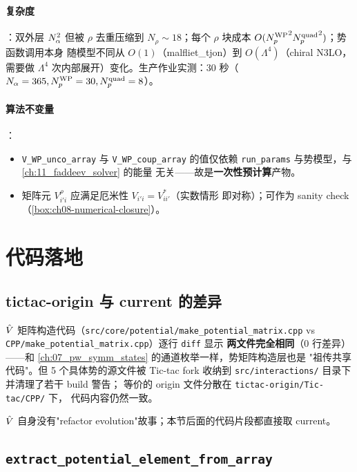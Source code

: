 \paragraph{复杂度}：双外层 \(N_\alpha^2\) 但被 \(\rho\) 去重压缩到
\(N_\rho \sim 18\)；每个 \(\rho\) 块成本 \(O({N_{p}^{\text{WP}}}^2 {N_{p}^{\text{quad}}}^2)\)；势函数调用本身
随模型不同从 \(O(1)\)（malfliet\_tjon）到 \(O(\Lambda^4)\)（chiral N3LO，需要做
\(\Lambda^4\) 次内部展开）变化。生产作业实测：30 秒（\(N_\alpha = 365, {N_{p}^{\text{WP}}} = 30,
{N_{p}^{\text{quad}}} = 8\)）。

\paragraph{算法不变量}：
\begin{itemize}
  \item \texttt{V\_WP\_unco\_array} 与 \texttt{V\_WP\_coup\_array} 的值仅依赖
        \texttt{run\_params} 与势模型，与 \cref{ch:11_faddeev_solver} 的能量
        无关——故是\textbf{一次性预计算}产物。
  \item 矩阵元 \(V_{i'i}^{\rho}\) 应满足厄米性 \(V_{i'i} = V_{ii'}^*\)（实数情形
        即对称）；可作为 sanity check（\cref{box:ch08-numerical-closure}）。
\end{itemize}

\section{代码落地}
\label{sec:ch08-code}

\subsection{tictac-origin 与 current 的差异}
\label{subsec:ch08-origin-current}

\(\hat{V}\) 矩阵构造代码（\texttt{src/core/potential/make\_potential\_matrix.cpp}
vs \texttt{CPP/make\_potential\_matrix.cpp}）逐行 \texttt{diff} 显示
\textbf{两文件完全相同}（\(0\) 行差异）——和
\cref{ch:07_pw_symm_states} 的通道枚举一样，势矩阵构造层也是
"祖传共享代码"。但 5 个具体势的源文件被 Tic-tac fork 收纳到
\texttt{src/interactions/} 目录下并清理了若干 build 警告；
等价的 origin 文件分散在 \texttt{tictac-origin/Tic-tac/CPP/} 下，
代码内容仍然一致。

\(\hat{V}\) 自身没有"refactor evolution"故事；本节后面的代码片段都直接取
current。

\subsection{\texttt{extract\_potential\_element\_from\_array}}
\label{subsec:ch08-extract-element}

